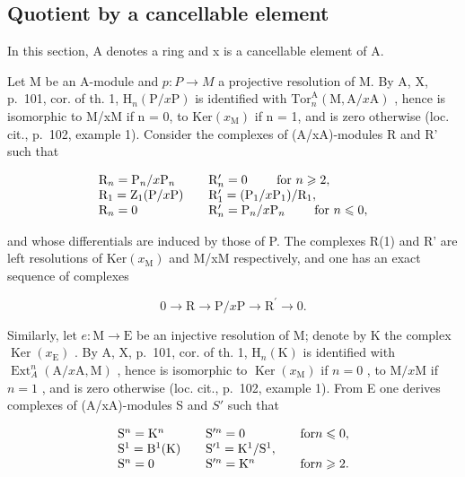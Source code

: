 \subsection{Quotient by a cancellable element}

In this section, A denotes a ring and x is a cancellable element of A.

Let M be an A-module and \(p: P \to M\) a projective resolution of M. By A, X, p.~101, cor. of th. 1, \(\mathrm{H}_{n}(\mathrm{P}/x\mathrm{P})\) is identified with \(\mathrm{Tor}_{n}^{\mathrm{A}}(\mathrm{M}, \mathrm{A}/x\mathrm{A})\) , hence is isomorphic to M/xM if n = 0, to \(\mathrm{Ker}(x_{\mathrm{M}})\) if n = 1, and is zero otherwise (loc. cit., p.~102, example 1). Consider the complexes of (A/xA)-modules R and R' such that

\[
\begin{array}{l l} \mathrm{R} _ {n} = \mathrm{P} _ {n} / x \mathrm{P} _ {n} & \quad \mathrm{R} _ {n} ^ {\prime} = 0 \qquad \text { for } n \geqslant 2, \\ \mathrm{R} _ {1} = \mathrm{Z} _ {1} (\mathrm{P} / x \mathrm{P}) & \quad \mathrm{R} _ {1} ^ {\prime} = (\mathrm{P} _ {1} / x \mathrm{P} _ {1}) / \mathrm{R} _ {1}, \\ \mathrm{R} _ {n} = 0 & \quad \mathrm{R} _ {n} ^ {\prime} = \mathrm{P} _ {n} / x \mathrm{P} _ {n} \qquad \text { for } n \leqslant 0, \end{array}
\]

and whose differentials are induced by those of P. The complexes R(1) and R' are left resolutions of \(\mathrm{Ker}(x_{\mathrm{M}})\) and M/xM respectively, and one has an exact sequence of complexes

\[
0 \rightarrow \mathrm{R} \longrightarrow \mathrm{P} / x \mathrm{P} \longrightarrow \mathrm{R} ^ {\prime} \longrightarrow 0.\tag{2}
\]

Similarly, let \(e: \mathrm{M} \to \mathrm{E}\) be an injective resolution of M; denote by K the complex \(\operatorname{Ker}(x_{\mathrm{E}})\) . By A, X, p.~101, cor. of th. 1, \(\mathrm{H}_n(\mathrm{K})\) is identified with \(\operatorname{Ext}_A^n (\mathrm{A} / x\mathrm{A},\mathrm{M})\) , hence is isomorphic to \(\operatorname{Ker}(x_{\mathrm{M}})\) if \(n = 0\) , to \(\mathrm{M} / x\mathrm{M}\) if \(n = 1\) , and is zero otherwise (loc. cit., p.~102, example 1). From E one derives complexes of (A/xA)-modules S and \(S'\) such that

\[
\begin{array}{l l l} \mathrm{S} ^ {n} = \mathrm{K} ^ {n} & \quad \mathrm{S} ^ {\prime n} = 0 & \quad \text {for} n \leqslant 0, \\ \mathrm{S} ^ {1} = \mathrm{B} ^ {1} (\mathrm{K}) & \quad \mathrm{S} ^ {\prime 1} = \mathrm{K} ^ {1} / \mathrm{S} ^ {1}, \\ \mathrm{S} ^ {n} = 0 & \quad \mathrm{S} ^ {\prime n} = \mathrm{K} ^ {n} & \quad \text {for} n \geqslant 2. \end{array}
\]

